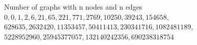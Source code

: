 Number of graphs with n nodes and n edges\\
$0,0,1,2,6,21,65,221,771,2769,10250,39243,154658,$
$628635,2632420,11353457,50411413,230341716,1082481189,$
$5228952960,25945377057,132140242356,690238318754$
